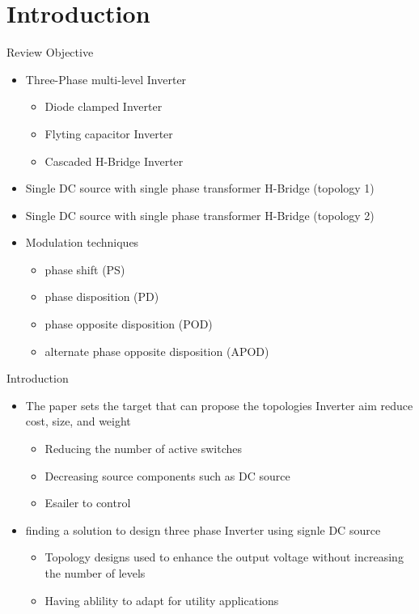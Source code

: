 \documentclass[
	11pt, %
]{beamer}
\begin{document}

\section{Introduction}
\begin{frame}{Review Objective}
	\begin{itemize}
		\scriptsize
		\setlength{\itemsep}{10pt}
		\item {Three-Phase multi-level Inverter}
		\begin{itemize}
			\scriptsize
			\item{Diode clamped Inverter}
			\item{Flyting capacitor Inverter}
			\item{Cascaded H-Bridge Inverter}
		\end{itemize}
		\item{Single DC source with single phase transformer H-Bridge (topology 1)}
		\item{Single DC source with single phase transformer H-Bridge (topology 2)}
		\item{Modulation techniques}
		\begin{itemize}
			\scriptsize
			\item {phase shift (PS)}
			\item {phase disposition (PD)}
			\item {phase opposite disposition (POD)}
			\item {alternate phase opposite disposition (APOD)}
		\end{itemize}
	\end{itemize}
\end{frame}

\begin{frame}{Introduction}
	\begin{itemize}
		\scriptsize
		\setlength{\itemsep}{10pt}
		\item {The paper sets the target that can propose the topologies Inverter aim reduce cost, size, and weight}
			\begin{itemize}
				\scriptsize
				\item {Reducing the number of active switches}
				\item {Decreasing source components such as DC source}
				\item {Esailer to control}
			\end{itemize}
		\item{finding a solution to design three phase Inverter using signle DC source}
		\begin{itemize}
			\scriptsize
			\item {Topology designs used to enhance the output voltage without increasing the number of levels}
			\item {Having ablility to adapt for utility applications}
		\end{itemize}
	\end{itemize}
\end{frame}
\end{document}
